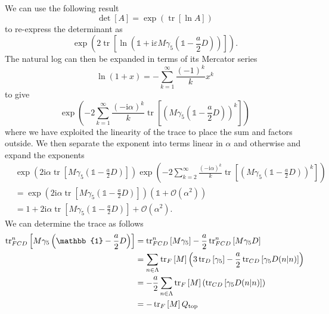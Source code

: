 \documentclass[a4paper,10pt]{book}
\begin{document}
We can use the following result
\begin{equation}
\operatorname{det}[A]=\exp (\operatorname{tr}[\ln A])
\end{equation}
to re-express the determinant as 
\begin{equation*}
\exp \left(2 \operatorname{tr}\left[\ln \left(\mathbb{1}+\mathrm{i} \varepsilon M \gamma_{5}\left(\mathbb{1}-\frac{a}{2} D\right)\right)\right]\right).
\end{equation*}
The natural log can then be expanded in terms of its Mercator series
\begin{equation}
\ln (1+x)=-\sum_{k=1}^{\infty} \frac{(-1)^{k}}{k} x^{k}
\end{equation}
to give 
\begin{equation*}
\exp \left(-2 \sum_{k=1}^{\infty} \frac{(-\mathrm{i} \alpha)^{k}}{k} \operatorname{tr}\left[\left(M \gamma_{5}\left(\mathbb{1}-\frac{a}{2} D\right)\right)^{k}\right]\right)
\end{equation*}
where we have exploited the linearity of the trace to place the sum and factors outside. We then separate the exponent into terms linear in $\alpha$ and otherwise and expand the exponents
\begin{equation}
\begin{aligned} 
 &\exp \left(2\mathrm{i} \alpha \operatorname{tr}\left[M \gamma_{5}\left(\mathbb{1}-\frac{a}{2} D\right)\right]\right)
\exp \left(-2 \sum_{k=2}^{\infty} \frac{(-\mathrm{i} \alpha)^{k}}{k} \operatorname{tr}\left[\left(M \gamma_{5}\left(\mathbb{1}-\frac{a}{2} D\right)\right)^{k}\right]\right)\\ &=\exp \left(2\mathrm{i} \alpha \operatorname{tr}\left[M \gamma_{5}\left(\mathbb{1}-\frac{a}{2} D\right)\right]\right)\left( \mathbb{1}+\mathcal{O}(\alpha^2) \right)\\&=1+2 \mathrm{i} \alpha \operatorname{tr}\left[M \gamma_{5}\left(\mathbb{1}-\frac{a}{2} D\right)\right]+\mathcal{O}\left(\alpha^{2}\right).
\end{aligned}
\end{equation}
We can determine the trace as follows
\begin{equation}
\begin{aligned} 
\operatorname{tr}_{FCD}^n\left[M \gamma_{5}\left(\mathbb{1}-\frac{a}{2} D\right)\right] &= \operatorname{tr}_{FCD}^n\left[M \gamma_{5}\right]-\frac{a}{2}\operatorname{tr}_{FCD}^n\left[ M \gamma_{5}D \right]\\&=\sum_{n \in \Lambda}\operatorname{tr}_{F}\left[M\right]\left( 3\operatorname{tr}_{D}\left[\gamma_{5}\right]-\frac{a}{2}\operatorname{tr}_{CD}\left[\gamma_{5}D(n\mkern-5mu\mid\mkern-5mu n) \right] \right)\\&=-\frac{a}{2}\sum_{n \in \Lambda}\operatorname{tr}_{F}\left[M\right]\left( \operatorname{tr}_{CD}\left[\gamma_{5}D(n\mkern-5mu\mid\mkern-5mu n) \right] \right)\\&=-\operatorname{tr}_{F}\left[M\right]Q_{\mathrm{top}}
\end{aligned}
\end{equation}
\end{document}
